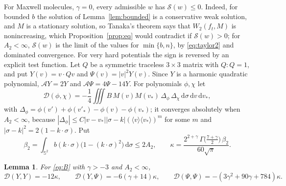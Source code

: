 \documentclass[11pt]{amsart}
\newtheorem{lemma}[theorem]{Lemma}
\theoremstyle{definition}
\newcommand{\Sph}{\mathbb{S}}
\newcommand{\dd}{\,\mathrm{d}}
\newcommand{\jb}[1]{\langle #1\rangle}
\begin{document}
For Maxwell molecules, $\gamma=0$, every admissible $w$ has $\mathcal S(w)\le0$. Indeed, for bounded $b$ the solution of Lemma~\ref{lem:bounded} is a conservative weak solution, and $M$ is a stationary solution, so Tanaka's theorem \cite{Tan78} says that $W_2(f_t,M)$ is nonincreasing, which Proposition~\ref{prop:eq} would contradict if $\mathcal S(w)>0$; for $A_2<\infty$, $\mathcal S(w)$ is the limit of the values for $\min\{b,n\}$, by \eqref{eq:taylor2} and dominated convergence. For very hard potentials the sign is reversed by an explicit test function. Let $Q$ be a symmetric traceless $3\times3$ matrix with $Q:Q=1$, and put $Y(v)=v\cdot Qv$ and $\Psi(v)=|v|^2Y(v)$. Since $Y$ is a harmonic quadratic polynomial, $\mathcal AY=2Y$ and $\mathcal A\Psi=4\Psi-14Y$. For polynomials $\phi,\chi$ let
\[
\mathcal D(\phi,\chi)=-\frac14\iiint B\,M(v)M(v_*)\,\Delta_\phi\,\Delta_\chi\dd\sigma\dd v\dd v_* ,
\]
with $\Delta_\phi=\phi(v')+\phi(v'_*)-\phi(v)-\phi(v_*)$; it converges absolutely when $A_2<\infty$, because $|\Delta_\phi|\le C|v-v_*||\sigma-k|(\jb{v}\jb{v_*})^m$ for some $m$ and $|\sigma-k|^2=2(1-k\cdot\sigma)$. Put
\[
\beta_2=\int_{\Sph^2}b(k\cdot\sigma)\big(1-(k\cdot\sigma)^2\big)\dd\sigma\le2A_2,\qquad\kappa=\frac{2^{2+\gamma}\,\Gamma\big(\frac{7+\gamma}2\big)\,\beta_2}{60\sqrt\pi}.
\]

\begin{lemma}\label{lem:brackets}
For \eqref{eq:B} with $\gamma>-3$ and $A_2<\infty$,
\[
\mathcal D(Y,Y)=-12\kappa,\qquad\mathcal D(Y,\Psi)=-6(\gamma+14)\kappa,\qquad\mathcal D(\Psi,\Psi)=-(3\gamma^2+90\gamma+784)\kappa .
\]
\end{lemma}
\end{document}
